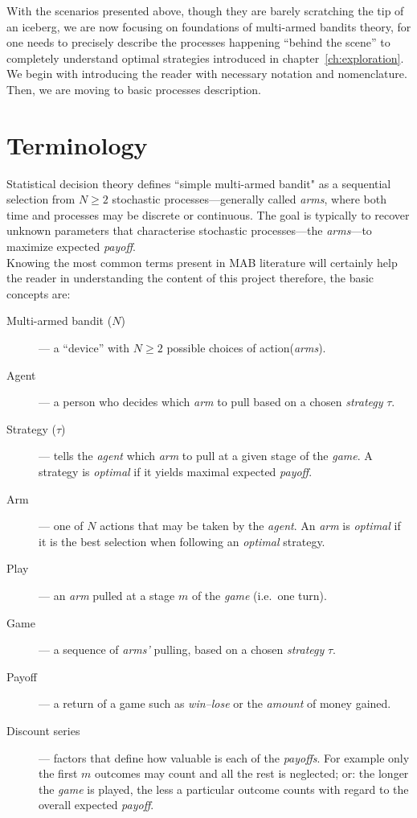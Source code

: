 \documentclass[12pt, a4paper, pdflatex, leqno, twoside]{report}
\begin{document}
With the scenarios presented above, though they are barely scratching the tip of an iceberg, we 
are now focusing on foundations of multi-armed bandits theory, for one needs to 
precisely describe the processes happening ``behind the scene'' to completely understand optimal strategies introduced in chapter~\ref{ch:exploration}.\\
We begin with introducing the reader with necessary notation and nomenclature. 
Then, we are moving to basic processes description.   


\section{Terminology}
Statistical decision theory defines ``simple multi-armed bandit" as a 
sequential selection from $N \geq 2$ stochastic processes---generally called 
\emph{arms}, where both time and processes may be discrete or continuous. The 
goal is typically to recover unknown parameters that characterise stochastic 
processes---the \emph{arms}---to maximize expected \emph{payoff}.\\

Knowing the most common terms present in MAB literature will certainly help the reader in understanding 
the content of this project therefore, the basic concepts are:
\begin{description}
\item[Multi-armed bandit ($N$)]--- a ``device'' with $N \geq 2$ possible choices 
of action(\emph{arms}).
\item[Agent]--- a person who decides which \emph{arm} to pull based on a chosen 
\emph{strategy} $\tau$.
\item[Strategy ($\tau$)]--- tells the \emph{agent} which \emph{arm} to pull at a 
given stage of the \emph{game}. A strategy is \emph{optimal} if it yields 
maximal expected \emph{payoff}.
\item[Arm]--- one of $N$ actions that may be taken by the \emph{agent}. An 
\emph{arm} is \emph{optimal} if it is the best selection when following an 
\emph{optimal} strategy.
\item[Play]--- an \emph{arm} pulled at a stage $m$ of the \emph{game} (i.e.\ one 
turn).
\item[Game]--- a sequence of \emph{arms'} pulling, based on a chosen \emph{strategy} 
$\tau$.
\item[Payoff]--- a return of a game such as \emph{win--lose} or the \emph{amount} 
of money gained.
\item[Discount series]--- factors that define how valuable is each of  the
\emph{payoffs}. For example only the first $m$ outcomes may count and all the rest 
is neglected; or: the longer the \emph{game} is played, the less a particular 
outcome counts with regard to the overall expected \emph{payoff}.
\end{description}                                      
\end{document}
